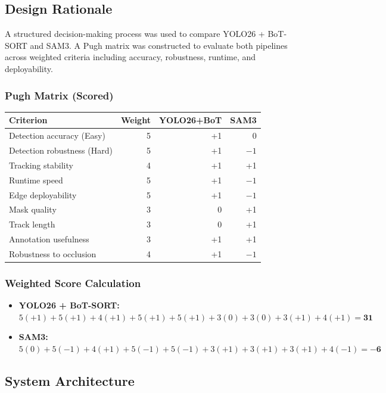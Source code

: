 \documentclass[12pt,letterpaper]{article}
\begin{document}
\subsection{Design Rationale}

A structured decision-making process was used to compare YOLO26 + BoT-SORT and SAM3. A Pugh matrix was constructed to evaluate both pipelines across weighted criteria including accuracy, robustness, runtime, and deployability.

\subsubsection{Pugh Matrix (Scored)}

\begin{tabular}{|p{5cm}|r|r|r|}
\hline
\textbf{Criterion} & \textbf{Weight} & \textbf{YOLO26+BoT} & \textbf{SAM3} \\
\hline
Detection accuracy (Easy) & 5 & +1 & 0 \\
Detection robustness (Hard) & 5 & +1 & $-1$ \\
Tracking stability & 4 & +1 & +1 \\
Runtime speed & 5 & +1 & $-1$ \\
Edge deployability & 5 & +1 & $-1$ \\
Mask quality & 3 & 0 & +1 \\
Track length & 3 & 0 & +1 \\
Annotation usefulness & 3 & +1 & +1 \\
Robustness to occlusion & 4 & +1 & $-1$ \\
\hline
\end{tabular}

\subsubsection{Weighted Score Calculation}

\begin{itemize}
    \item \textbf{YOLO26 + BoT-SORT:}\\
    $5(+1) + 5(+1) + 4(+1) + 5(+1) + 5(+1) + 3(0) + 3(0) + 3(+1) + 4(+1) = \mathbf{31}$

    \item \textbf{SAM3:}\\
    $5(0) + 5(-1) + 4(+1) + 5(-1) + 5(-1) + 3(+1) + 3(+1) + 3(+1) + 4(-1) = \mathbf{-6}$
\end{itemize}

\subsection{System Architecture}
\end{document}
